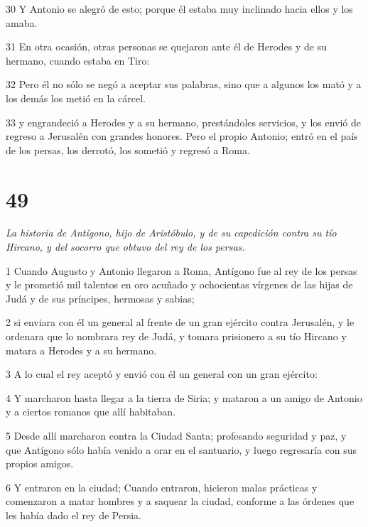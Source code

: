 \par 30 Y Antonio se alegró de esto; porque él estaba muy inclinado hacia ellos y los amaba.

\par 31 En otra ocasión, otras personas se quejaron ante él de Herodes y de su hermano, cuando estaba en Tiro:

\par 32 Pero él no sólo se negó a aceptar sus palabras, sino que a algunos los mató y a los demás los metió en la cárcel.

\par 33 y engrandeció a Herodes y a su hermano, prestándoles servicios, y los envió de regreso a Jerusalén con grandes honores. Pero el propio Antonio; entró en el país de los persas, los derrotó, los sometió y regresó a Roma.

\chapter{49}

\par \textit{La historia de Antígono, hijo de Aristóbulo, y de su capedición contra su tío Hircano, y del socorro que obtuvo del rey de los persas.}

\par 1 Cuando Augusto y Antonio llegaron a Roma, Antígono fue al rey de los persas y le prometió mil talentos en oro acuñado y ochocientas vírgenes de las hijas de Judá y de sus príncipes, hermosas y sabias;

\par 2 si enviara con él un general al frente de un gran ejército contra Jerusalén, y le ordenara que lo nombrara rey de Judá, y tomara prisionero a su tío Hircano y matara a Herodes y a su hermano.

\par 3 A lo cual el rey aceptó y envió con él un general con un gran ejército:

\par 4 Y marcharon hasta llegar a la tierra de Siria; y mataron a un amigo de Antonio y a ciertos romanos que allí habitaban.

\par 5 Desde allí marcharon contra la Ciudad Santa; profesando seguridad y paz, y que Antígono sólo había venido a orar en el santuario, y luego regresaría con sus propios amigos.

\par 6 Y entraron en la ciudad; Cuando entraron, hicieron malas prácticas y comenzaron a matar hombres y a saquear la ciudad, conforme a las órdenes que les había dado el rey de Persia.

